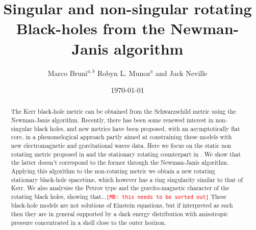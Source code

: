 \documentclass[12pt]{iopart}
\def\mbc#1{\textcolor{red}{\tt[MB: #1]}}
\begin{document}
\title{Singular and non-singular rotating Black-holes from the Newman-Janis algorithm}


\author{Marco Bruni${{^{a,b}}}$   Robyn L. Munoz${{^a}}$ and Jack Neville
}

\address{${{^a}}$Institute of Cosmology {\rm \&} Gravitation, University of Portsmouth, Dennis Sciama Building, Burnaby Road, Portsmouth, PO1 3FX, United Kingdom}
\address{${{^b}}$INFN Sezione di Trieste, Via Valerio 2, 34127 Trieste, Italy}


\vspace{10pt}
\begin{indented}
\item[]\date{\today}
\end{indented}

\begin{abstract}
The Kerr black-hole metric can be obtained from the Schwarzschild metric using the Newman-Janis algorithm. Recently, there has been some renewed interest in non-singular black holes, and new metrics have been proposed, with an asymptotically flat  core, in a phenomelogical approach partly aimed at constraining these models with new electromagnetic and gravitational waves data. Here we focus on the static non rotating metric proposed in  \cite{Ghosh:2014pba,Simpson:2019mud} and the stationary rotating counterpart in \cite{Simpson:2021dyo}. We show that the latter doesn't correspond to the former through the Newman-Janis algorithm. Applying this algorithm  to the non-rotating metric we obtain a new rotating stationary black-hole spacetime, which however has a ring singularity similar to that of Kerr. We also analysise the Petrov type and the gravito-magnetic character of the rotating black holes, showing that...\mbc{this needs to be sorted out} These black-hole models are not solutions of Einstein equations, but if interpreted as such then they are in general supported by a  dark energy distribution with anisotropic pressure concentrated in a shell close to the outer horizon. 
\end{abstract}
\end{document}
